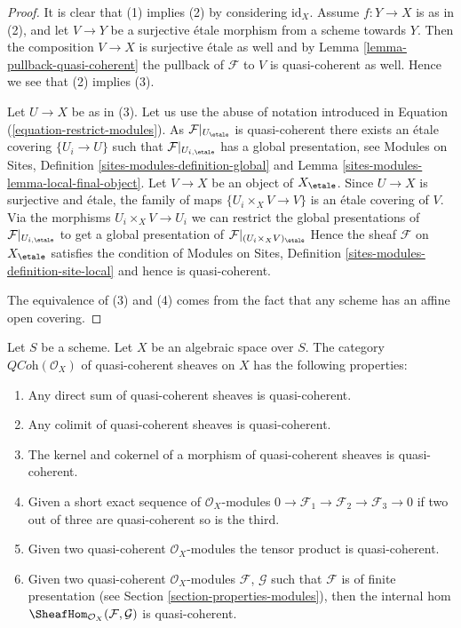 \begin{proof}
It is clear that (1) implies (2) by considering $\text{id}_X$.
Assume $f : Y \to X$ is as in (2), and let $V \to Y$ be a surjective
\'etale morphism from a scheme towards $Y$. Then the composition $V \to X$ is
surjective \'etale as well
and by Lemma \ref{lemma-pullback-quasi-coherent} the pullback of $\mathcal{F}$
to $V$ is quasi-coherent as well. Hence we see that (2) implies (3).

\medskip\noindent
Let $U \to X$ be as in (3). Let us use the abuse of notation introduced
in Equation (\ref{equation-restrict-modules}).
As $\mathcal{F}|_{U_\etale}$ is quasi-coherent there exists an
\'etale covering $\{U_i \to U\}$ such that
$\mathcal{F}|_{U_{i, \etale}}$ has a global presentation, see
Modules on Sites, Definition \ref{sites-modules-definition-global} and
Lemma \ref{sites-modules-lemma-local-final-object}.
Let $V \to X$ be an object of $X_\etale$. Since $U \to X$ is
surjective and \'etale, the family of maps $\{U_i \times_X V \to V\}$ is an
\'etale covering
of $V$. Via the morphisms $U_i \times_X V \to U_i$ we can restrict the
global presentations of $\mathcal{F}|_{U_{i, \etale}}$ to get a global
presentation of $\mathcal{F}|_{(U_i \times_X V)_\etale}$
Hence the sheaf $\mathcal{F}$ on $X_\etale$ satisfies the condition of
Modules on Sites, Definition \ref{sites-modules-definition-site-local}
and hence is quasi-coherent.

\medskip\noindent
The equivalence of (3) and (4) comes from the fact that any scheme has
an affine open covering.
\end{proof}

\begin{lemma}
\label{lemma-properties-quasi-coherent}
Let $S$ be a scheme. Let $X$ be an algebraic space over $S$.
The category $\textit{QCoh}(\mathcal{O}_X)$ of quasi-coherent sheaves on $X$
has the following properties:
\begin{enumerate}
\item Any direct sum of quasi-coherent sheaves is quasi-coherent.
\item Any colimit of quasi-coherent sheaves is quasi-coherent.
\item The kernel and cokernel of a morphism of quasi-coherent sheaves
is quasi-coherent.
\item Given a short exact sequence of $\mathcal{O}_X$-modules
$0 \to \mathcal{F}_1 \to \mathcal{F}_2 \to \mathcal{F}_3 \to 0$
if two out of three are quasi-coherent so is the third.
\item Given two quasi-coherent $\mathcal{O}_X$-modules
the tensor product is quasi-coherent.
\item Given two quasi-coherent $\mathcal{O}_X$-modules
$\mathcal{F}$, $\mathcal{G}$ such that $\mathcal{F}$
is of finite presentation (see
Section \ref{section-properties-modules}),
then the internal hom
$\SheafHom_{\mathcal{O}_X}(\mathcal{F}, \mathcal{G})$
is quasi-coherent.
\end{enumerate}
\end{lemma}


